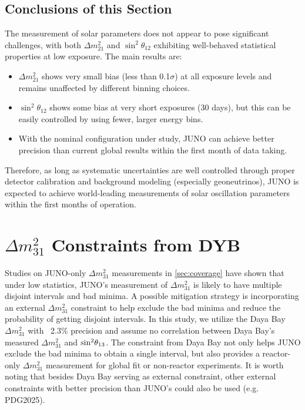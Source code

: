 
\subsection{Conclusions of this Section}
The measurement of solar parameters does not appear to pose significant challenges, with both $\Delta m^2_{21}$ and $\sin^2\theta_{12}$ exhibiting well-behaved statistical properties at low exposure. The main results are:
\begin{itemize}
    \item $\Delta m^2_{21}$ shows very small bias (less than 0.1$\sigma$) at all exposure levels and remains unaffected by different binning choices.
    \item $\sin^2\theta_{12}$ shows some bias at very short exposures (30 days), but this can be easily controlled by using fewer, larger energy bins.
    \item With the nominal configuration under study, JUNO can achieve better precision than current global results within the first month of data taking. 
\end{itemize}
Therefore, as long as systematic uncertainties are well controlled through proper detector calibration and background modeling (especially geoneutrinos), JUNO is expected to achieve world-leading measurements of solar oscillation parameters within the first months of operation.


\section{$\Delta m^2_{31}$ Constraints from DYB}\label{sec:dm231constraints}
Studies on JUNO-only $\Delta m^2_{31}$ measurements in \autoref{sec:coverage} have shown that under low statistics, JUNO's measurement of $\Delta m^2_{31}$ is likely to have multiple disjoint intervals and bad minima. A possible mitigation strategy is incorporating an external $\Delta m^2_{31}$ constraint to help exclude the bad minima and reduce the probability of getting disjoint intervals. In this study, we utilize the Daya Bay $\Delta m^2_{31}$ with ~2.3\% precision and assume no correlation between Daya Bay's measured $\Delta m^2_{31}$ and $\rm sin^2\theta_{13}$. The constraint from Daya Bay not only helps JUNO exclude the bad minima to obtain a single interval, but also provides a reactor-only $\Delta m^2_{31}$ measurement for global fit or non-reactor experiments. It is worth noting that besides Daya Bay serving as external constraint, other external constraints with better precision than JUNO's could also be used (e.g. PDG2025). 

